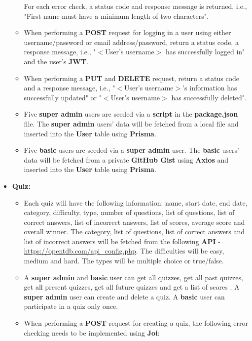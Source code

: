 \documentclass{article}
\begin{document}
\begin{itemize}
\begin{itemize}
\begin{itemize}
		\end{itemize}
		For each error check, a status code and response message is returned, i.e., "First name must have a minimum length of two characters".
		\item When performing a \textbf{POST} request for logging in a user using either username/password or email address/password, return a status code, a response message, i.e., "$<$User's username$>$ has successfully logged in" and the user's \textbf{JWT}.
		\item When performing a \textbf{PUT} and \textbf{DELETE} request, return a status code and a response message, i.e., "$<$User's username$>$'s information has successfully updated" or "$<$User's username$>$ has successfully deleted".
		\item Five \textbf{super admin} users are seeded via a \textbf{script} in the \textbf{package.json} file. The \textbf{super admin} users' data will be fetched from a local file and inserted into the \textbf{User} table using \textbf{Prisma}.  
		\item Five \textbf{basic} users are seeded via a \textbf{super admin} user. The \textbf{basic} users' data will be fetched from a private \textbf{GitHub Gist} using \textbf{Axios} and inserted into the \textbf{User} table using \textbf{Prisma}. 
	\end{itemize} 
	\item \textbf{Quiz:}
	\begin{itemize}
		\item Each quiz will have the following information: name, start date, end date, category, difficulty, type, number of questions, list of questions, list of correct answers, list of incorrect answers, list of scores, average score and overall winner. The category, list of questions, list of correct answers and list of incorrect answers will be fetched from the following \textbf{API} - \href{https://opentdb.com/api\_config.php}{https://opentdb.com/api\_config.php}. The difficulties will be easy, medium and hard. The types will be multiple choice or true/false.
		\item A \textbf{super admin} and \textbf{basic} user can get all quizzes, get all past quizzes, get all present quizzes, get all future quizzes and get a list of scores . A \textbf{super admin} user can create and delete a quiz. A \textbf{basic} user can participate in a quiz only once.
		\item When performing a \textbf{POST} request for creating a quiz, the following error checking needs to be implemented using \textbf{Joi}:

\end{itemize}
\end{itemize}
\end{document}
